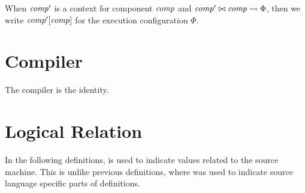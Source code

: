 \documentclass[a4paper]{article}
\begin{document}
\begin{definition}
  \begin{mathpar}
  \end{mathpar}
\end{definition}

\begin{definition}
  When $\var{comp'}$ is a context for component $\var{comp}$ and $\var{comp}' \bowtie \var{comp} \rightsquigarrow \Phi$, 
  then we write $\plug{\var{comp'}}{\var{comp}}$ for the execution configuration $\Phi$.
\end{definition}

\section{Compiler}
\label{sec:compiler}

The compiler is the identity.

\section{Logical Relation}
In the following definitions,  is used to indicate values related to the source machine. This is unlike previous definitions, where  was used to indicate source language specific parts of definitions.
\end{document}
